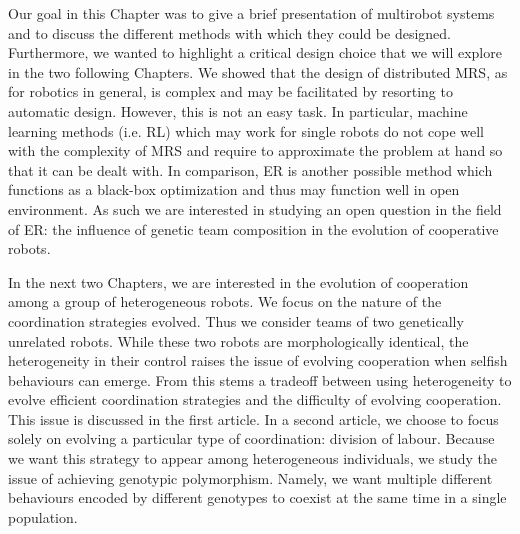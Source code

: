   Our goal in this Chapter was to give a brief presentation of multirobot systems and to discuss the different methods with which they could be designed. Furthermore, we wanted to highlight a critical design choice that we will explore in the two following Chapters. We showed that the design of distributed MRS, as for robotics in general, is complex and may be facilitated by resorting to automatic design. However, this is not an easy task. In particular, machine learning methods (i.e. RL) which may work for single robots do not cope well with the complexity of MRS and require to approximate the problem at hand so that it can be dealt with. In comparison, ER is another possible method which functions as a black-box optimization and thus may function well in open environment. As such we are interested in studying an open question in the field of ER: the influence of genetic team composition in the evolution of cooperative robots.


  In the next two Chapters, we are interested in the evolution of cooperation among a group of heterogeneous robots. We focus on the nature of the coordination strategies evolved. Thus we consider teams of two genetically unrelated robots. While these two robots are morphologically identical, the heterogeneity in their control raises the issue of evolving cooperation when selfish behaviours can emerge. From this stems a tradeoff between using heterogeneity to evolve efficient coordination strategies and the difficulty of evolving cooperation. This issue is discussed in the first article. In a second article, we choose to focus solely on evolving a particular type of coordination: division of labour. Because we want this strategy to appear among heterogeneous individuals, we study the issue of achieving genotypic polymorphism. Namely, we want multiple different behaviours encoded by different genotypes to coexist at the same time in a single population.



